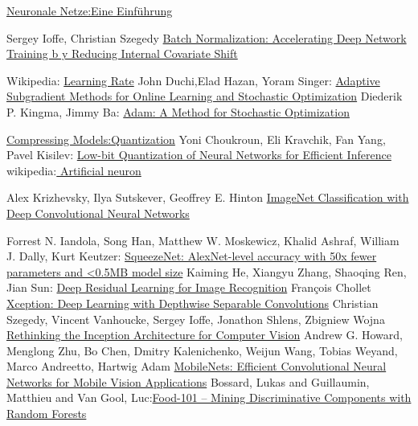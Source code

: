 \documentclass[12pt,a4paper]{scrartcl}
\numberwithin{equation}{section}
\begin{document}
\begin{thebibliography}{lem00}
 	\href{http://www.neuronalesnetz.de/aktivitaet.html}{Neuronale Netze:Eine Einführung}
 	
	Sergey Ioffe, Christian Szegedy
 	\href{https://arxiv.org/pdf/1502.03167.pdf}{Batch Normalization: Accelerating Deep Network Training b
 		y
 		Reducing Internal Covariate Shift}

	Wikipedia:
		\href{https://en.wikipedia.org/wiki/Learning_rate}{Learning Rate}
		John Duchi,Elad Hazan, Yoram Singer:
		\href{http://www.jmlr.org/papers/volume12/duchi11a/duchi11a.pdf}{Adaptive Subgradient Methods for
			Online Learning and Stochastic Optimization}
		Diederik P. Kingma, Jimmy Ba:
		\href{https://arxiv.org/abs/1412.6980}{Adam: A Method for Stochastic Optimization}
		
		\href{https://nervanasystems.github.io/distiller/quantization.html}{Compressing Models:Quantization}
		Yoni Choukroun, Eli Kravchik, Fan Yang, Pavel Kisilev:
			\href{https://arxiv.org/abs/1902.06822}{Low-bit Quantization of Neural Networks for Efficient Inference}
	wikipedia:\href{https://en.wikipedia.org/wiki/Artificial_neuron}{ Artificial neuron}
	
	Alex Krizhevsky, Ilya Sutskever, Geoffrey E. Hinton
		\href{https://papers.nips.cc/paper/4824-imagenet-classification-with-deep-convolutional-neural-networks.pdf}{ImageNet Classification with Deep Convolutional Neural Networks}
  
  	Forrest N. Iandola, Song Han, Matthew W. Moskewicz, Khalid Ashraf, William J. Dally, Kurt Keutzer:
  	\href{https://arxiv.org/abs/1602.07360}{SqueezeNet: AlexNet-level accuracy with 50x fewer parameters and <0.5MB model size}
  		Kaiming He, Xiangyu Zhang, Shaoqing Ren, Jian Sun:
  		\href{https://arxiv.org/pdf/1512.03385.pdf}{Deep Residual Learning for Image Recognition}
  			François Chollet
  		\href{https://arxiv.org/abs/1610.02357}{Xception: Deep Learning with Depthwise Separable Convolutions}
 Christian Szegedy, Vincent Vanhoucke, Sergey Ioffe, Jonathon Shlens, Zbigniew Wojna
  			\href{https://arxiv.org/abs/1512.00567}{Rethinking the Inception Architecture for Computer Vision}
			Andrew G. Howard, Menglong Zhu, Bo Chen, Dmitry Kalenichenko, Weijun Wang, Tobias Weyand, Marco Andreetto, Hartwig Adam \href{https://arxiv.org/abs/1704.04861}{MobileNets: Efficient Convolutional Neural Networks for Mobile Vision Applications}
			Bossard, Lukas and Guillaumin, Matthieu and Van Gool, Luc:\href{https://www.vision.ee.ethz.ch/datasets_extra/food-101/}{Food-101 -- Mining Discriminative Components with Random Forests}
\end{thebibliography}

 
      

\newpage
  
 \thispagestyle{empty}


\vspace*{8cm}





\listoffigures
\end{document}
